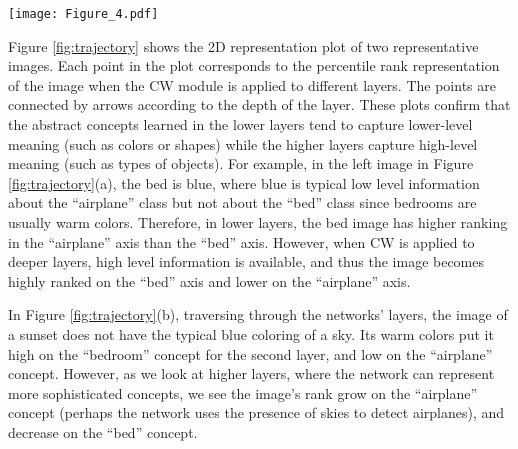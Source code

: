 \documentclass{article}
\begin{document}
\begin{figure*}[t]
    \centering
    \texttt{[image: Figure\_4.pdf]}
    \caption{2D representation plot of two representative images. Each point in the right trajectory plot corresponds to the percentile rank for the activation values on each axis. The number labeling each point on the plot provides the layer depth of the CW module. The trajectory shows how the percentile rank of the left image changes when CW is applied to different layers. \label{fig:trajectory}}
\end{figure*}

Figure \ref{fig:trajectory} shows the 2D representation plot of two representative images. Each point in the plot corresponds to the percentile rank representation of the image when the CW module is applied to different layers. The points are connected by arrows according to the depth of the layer. These plots confirm that the abstract concepts learned in the lower layers tend to capture lower-level meaning (such as colors or shapes) while the higher layers capture high-level meaning (such as types of objects). For example, in the left image in Figure  \ref{fig:trajectory}(a), the bed is blue, where blue is typical low level information about the ``airplane'' class but not about the ``bed'' class since bedrooms are usually warm colors. Therefore, in lower layers, the bed image has higher ranking in the ``airplane'' axis than the ``bed'' axis. However, when CW is applied to deeper layers, high level information is available, and thus the image becomes highly ranked on the ``bed'' axis and lower on the ``airplane'' axis. 

In Figure \ref{fig:trajectory}(b), traversing through the networks' layers, the image of a sunset does not have the typical blue coloring of a sky. Its warm colors put it high on the ``bedroom'' concept for the second layer, and low on the ``airplane'' concept. However, as we look at higher layers, where the network can represent more sophisticated concepts, we see the image's rank grow on the ``airplane'' concept (perhaps the network uses the presence of skies to detect airplanes), and decrease on the ``bed'' concept.
\end{document}
